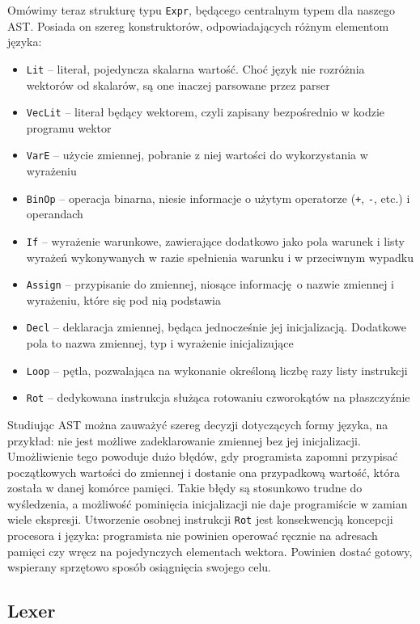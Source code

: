 Omówimy teraz strukturę typu \texttt{Expr}, będącego centralnym typem dla naszego AST. Posiada on szereg konstruktorów, odpowiadających różnym elementom języka:
\begin{itemize}
  \item \texttt{Lit} -- literał, pojedyncza skalarna wartość. Choć język nie rozróżnia wektorów od skalarów, są one inaczej parsowane przez parser
  \item \texttt{VecLit} -- literał będący wektorem, czyli zapisany bezpośrednio w kodzie programu wektor
  \item \texttt{VarE} -- użycie zmiennej, pobranie z niej wartości do wykorzystania w wyrażeniu
  \item \texttt{BinOp} -- operacja binarna, niesie informacje o użytym operatorze (\texttt{+}, \texttt{-}, etc.) i operandach
  \item \texttt{If} -- wyrażenie warunkowe, zawierające dodatkowo jako pola warunek i listy wyrażeń wykonywanych w razie spełnienia warunku i w przeciwnym wypadku
  \item \texttt{Assign} -- przypisanie do zmiennej, niosące informację o nazwie zmiennej i wyrażeniu, które się pod nią podstawia
  \item \texttt{Decl} -- deklaracja zmiennej, będąca jednocześnie jej inicjalizacją. Dodatkowe pola to nazwa zmiennej, typ i wyrażenie inicjalizujące
  \item \texttt{Loop} -- pętla, pozwalająca na wykonanie określoną liczbę razy listy instrukcji
  \item \texttt{Rot} -- dedykowana instrukcja służąca rotowaniu czworokątów na płaszczyźnie
\end{itemize}

Studiując AST można zauważyć szereg decyzji dotyczących formy języka, na przykład: nie jest możliwe zadeklarowanie zmiennej bez jej inicjalizacji. Umożliwienie tego powoduje dużo błędów, gdy programista zapomni przypisać początkowych wartości do zmiennej i dostanie ona przypadkową wartość, która została w danej komórce pamięci. Takie błędy są stosunkowo trudne do wyśledzenia, a możliwość pominięcia inicjalizacji nie daje programiście w zamian wiele ekspresji. Utworzenie osobnej instrukcji \texttt{Rot} jest konsekwencją koncepcji procesora i języka: programista nie powinien operować ręcznie na adresach pamięci czy wręcz na pojedynczych elementach wektora. Powinien dostać gotowy, wspierany sprzętowo sposób osiągnięcia swojego celu.

\subsection{Lexer}

